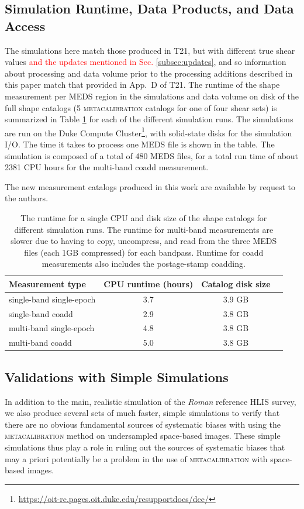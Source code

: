 \documentclass[fleqn,usenatbib]{mnras}
\begin{document}
\subsection{Simulation Runtime, Data Products, and Data Access}
The simulations here match those produced in T21, but with different true shear values \textcolor{red}{and the updates mentioned in Sec. \ref{subsec:updates}}, and so information about processing and data volume prior to the processing additions described in this paper match that provided in App.~D of T21.
The runtime of the shape measurement per MEDS region in the simulations and data volume on disk of the full shape catalogs (5 \textsc{metacalibration} catalogs for one of four shear sets) is summarized in Table \ref{tab:data} for each of the different simulation runs. The simulations are run on the Duke Compute Cluster\footnote{\url{https://oit-rc.pages.oit.duke.edu/rcsupportdocs/dcc/}}, with solid-state disks for the simulation I/O. The time it takes to process one MEDS file is shown in the table. The simulation is composed of a total of 480 MEDS files, for a total run time of about 2381 CPU hours for the multi-band coadd measurement.

The new measurement catalogs produced in this work are available by request to the authors.
\begin{table}
    \centering
    \begin{tabular}[width=\columnwidth]{l|c|c|c}
    \hline
    Measurement type &  CPU runtime (hours) & Catalog disk size  \\
    \hline 
    single-band single-epoch  & 3.7 & 3.9 GB \\
    single-band coadd  & 2.9 & 3.8 GB \\
    multi-band single-epoch  & 4.8 & 3.8 GB \\
    multi-band coadd  & 5.0 & 3.8 GB \\
    \hline
    \end{tabular}
    \caption{The runtime for a single CPU and disk size of the shape catalogs for different simulation runs. The runtime for multi-band measurements are slower due to having to copy, uncompress, and read from the three MEDS files (each 1GB compressed) for each bandpass. Runtime for coadd measurements also includes the postage-stamp coadding.}
    \label{tab:data}
\end{table}

\subsection{Validations with Simple Simulations}
\label{subsec:simplesim}
In addition to the main, realistic simulation of the \emph{Roman} reference HLIS survey, we also produce several sets of much faster, simple simulations  to verify that there are no obvious fundamental sources of systematic biases with using the \textsc{metacalibration} method on undersampled space-based images. These simple simulations thus play a role in ruling out the sources of systematic biases that may a priori  potentially be a problem in the use of \textsc{metacalibration} with space-based images. 
\end{document}
